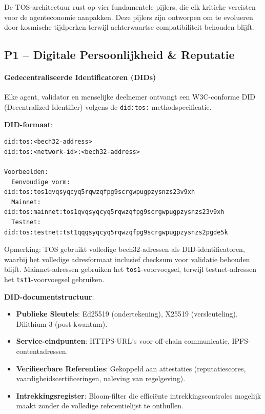 \documentclass[11pt]{article}
\begin{document}
De TOS-architectuur rust op vier fundamentele pijlers, die elk kritieke vereisten voor de agenteconomie aanpakken. Deze pijlers zijn ontworpen om te evolueren door kosmische tijdperken terwijl achterwaartse compatibiliteit behouden blijft.

\subsection{P1 -- Digitale Persoonlijkheid \& Reputatie}
\label{sec:pillar-identity}

\paragraph{Gedecentraliseerde Identificatoren (DIDs)}
Elke agent, validator en menselijke deelnemer ontvangt een W3C-conforme DID (Decentralized Identifier) volgens de \texttt{did:tos:} methodspecificatie.

\textbf{DID-formaat}:
\begin{verbatim}
did:tos:<bech32-address>
did:tos:<network-id>:<bech32-address>

Voorbeelden:
  Eenvoudige vorm:  did:tos:tos1qvqsyqcyq5rqwzqfpg9scrgwpugpzysnzs23v9xh
  Mainnet:          did:tos:mainnet:tos1qvqsyqcyq5rqwzqfpg9scrgwpugpzysnzs23v9xh
  Testnet:      did:tos:testnet:tst1qqqsyqcyq5rqwzqfpg9scrgwpugpzysnzs2pgde5k
\end{verbatim}
Opmerking: TOS gebruikt volledige bech32-adressen als DID-identificatoren, waarbij het volledige adresformaat inclusief checksum voor validatie behouden blijft. Mainnet-adressen gebruiken het \texttt{tos1}-voorvoegsel, terwijl testnet-adressen het \texttt{tst1}-voorvoegsel gebruiken.

\textbf{DID-documentstructuur}:
\begin{itemize}[noitemsep]
  \item \textbf{Publieke Sleutels}: Ed25519 (ondertekening), X25519 (versleuteling), Dilithium-3 (post-kwantum).
  \item \textbf{Service-eindpunten}: HTTPS-URL's voor off-chain communicatie, IPFS-contentadressen.
  \item \textbf{Verifieerbare Referenties}: Gekoppeld aan attestaties (reputatiescores, vaardigheidscertificeringen, naleving van regelgeving).
  \item \textbf{Intrekkingsregister}: Bloom-filter die efficiënte intrekkingscontroles mogelijk maakt zonder de volledige referentielijst te onthullen.
\end{itemize}
\end{document}
